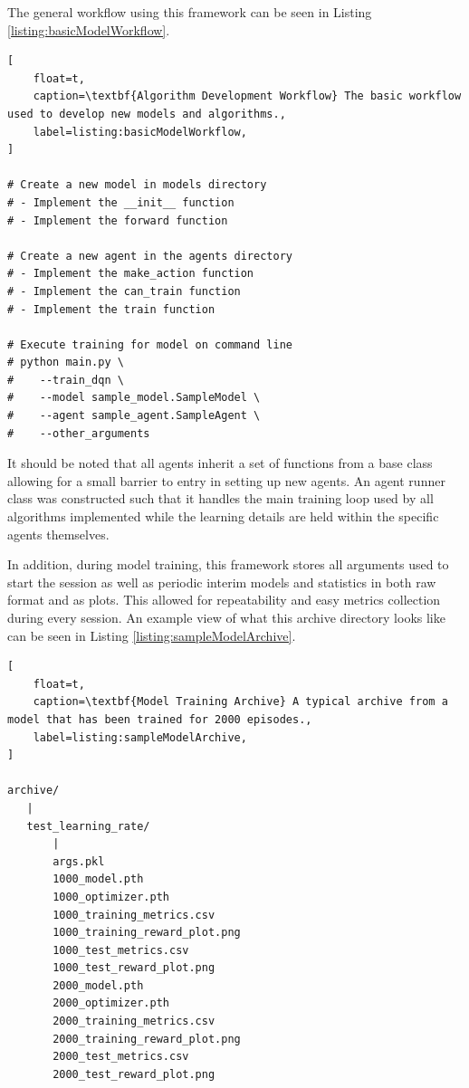 \documentclass[conference]{IEEEtran}
\begin{document}
The general workflow using this framework can be seen in Listing \ref{listing:basicModelWorkflow}.

\begin{lstlisting}[
    float=t,
    caption=\textbf{Algorithm Development Workflow} The basic workflow used to develop new models and algorithms.,
    label=listing:basicModelWorkflow,
]

# Create a new model in models directory
# - Implement the __init__ function
# - Implement the forward function

# Create a new agent in the agents directory
# - Implement the make_action function
# - Implement the can_train function
# - Implement the train function

# Execute training for model on command line
# python main.py \
#    --train_dqn \
#    --model sample_model.SampleModel \
#    --agent sample_agent.SampleAgent \
#    --other_arguments

\end{lstlisting}

It should be noted that all agents inherit a set of functions from a base class allowing for a small barrier to entry in setting up new agents.
An agent runner class was constructed such that it handles the main training loop used by all algorithms implemented while the learning details are held within the specific agents themselves.

In addition, during model training, this framework stores all arguments used to start the session as well as periodic interim models and statistics in both raw format and as plots.
This allowed for repeatability and easy metrics collection during every session.
An example view of what this archive directory looks like can be seen in Listing \ref{listing:sampleModelArchive}.

\begin{lstlisting}[
    float=t,
    caption=\textbf{Model Training Archive} A typical archive from a model that has been trained for 2000 episodes.,
    label=listing:sampleModelArchive,
]

archive/
   |
   test_learning_rate/
       |
       args.pkl
       1000_model.pth
       1000_optimizer.pth
       1000_training_metrics.csv
       1000_training_reward_plot.png
       1000_test_metrics.csv
       1000_test_reward_plot.png
       2000_model.pth
       2000_optimizer.pth
       2000_training_metrics.csv
       2000_training_reward_plot.png
       2000_test_metrics.csv
       2000_test_reward_plot.png
\end{lstlisting}
\end{document}
